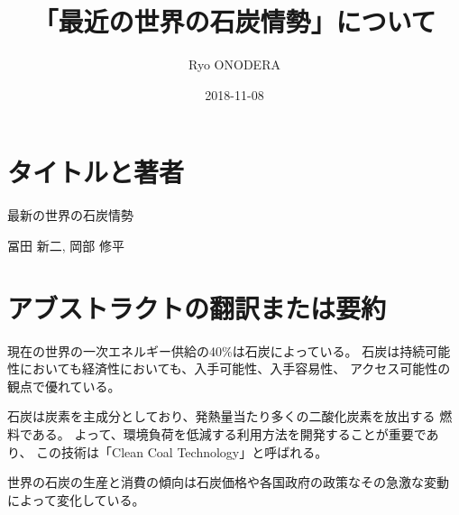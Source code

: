 \documentclass[a4j]{jsarticle}
\title{「最近の世界の石炭情勢」について}
\author[1]{Ryo ONODERA}
\affil[1]{tetera.org}
\date{2018-11-08}
\begin{document}

\maketitle


\section{タイトルと著者}
最新の世界の石炭情勢
~\cite{冨田新二2018}

冨田 新二, 岡部 修平


\section{アブストラクトの翻訳または要約}
現在の世界の一次エネルギー供給の40\%は石炭によっている。
石炭は持続可能性においても経済性においても、入手可能性、入手容易性、
アクセス可能性の観点で優れている。

石炭は炭素を主成分としており、発熱量当たり多くの二酸化炭素を放出する
燃料である。
よって、環境負荷を低減する利用方法を開発することが重要であり、
この技術は「Clean Coal Technology」と呼ばれる。

世界の石炭の生産と消費の傾向は石炭価格や各国政府の政策なその急激な変動
によって変化している。
\end{document}
